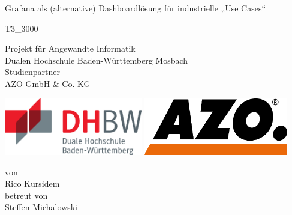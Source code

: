 \def\doctype{T3\_3000}
\def\title{Grafana als (alternative) Dashboardlösung für industrielle „Use Cases“}
\def\author{Rico Kursidem}
\def\supervisor{Steffen Michalowski}

\begin{titlepage}

\vspace{10mm}

\begin{center}
	
	\vspace{5mm}
	\huge \title
	
	\vspace{34pt}
	\large \doctype
		
	\vspace{30pt}	
	\small Projekt für Angewandte Informatik \\
	\large Dualen Hochschule Baden-Württemberg Mosbach \\
	\small Studienpartner \\
	\large AZO GmbH \& Co. KG \\
    \vspace{35pt}
    
    \includegraphics[height=2.5cm]{prefix/image/logo-dhbw.eps}
    \includegraphics[height=2.5cm]{prefix/image/logo-azo.png}
	
	\vspace{40pt}	
	\small von \\
	\large \author \\
	\small betreut von \\
	\large \supervisor
\end{center}

\vspace{75pt}


\vspace{49.7pt}


\end{titlepage}